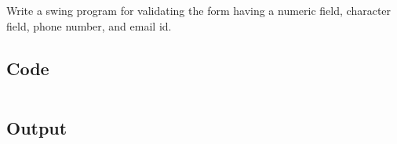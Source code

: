 \documentclass[../main.tex]{subfiles}
\begin{document}
Write a swing program for validating the form having a numeric field, character
field, phone number, and email id.

\subsection{Code}
\inputminted[frame=lines, breaklines, breakanywhere, numberblanklines=false]{java}{./programs/prog11/Swing.java}

\subsection{Output}
\end{document}
